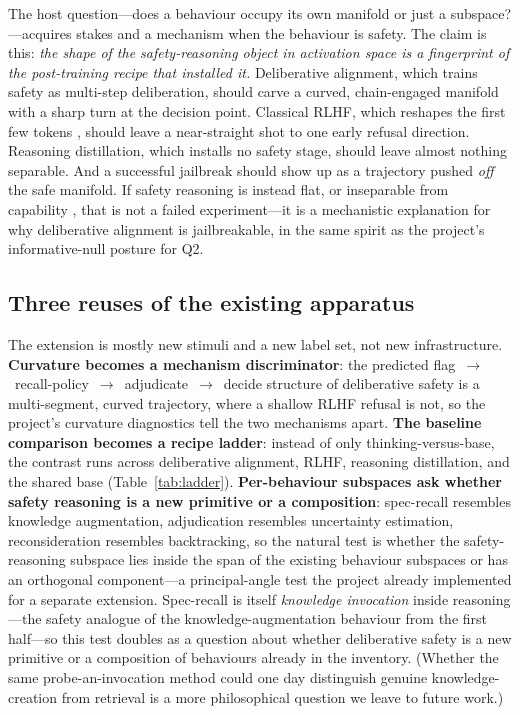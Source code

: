 \documentclass[10pt]{article}
\begin{document}
The host question---does a behaviour occupy its own manifold or just a
subspace?---acquires stakes and a mechanism when the behaviour is safety. The claim
is this: \emph{the shape of the safety-reasoning object in activation space is a
fingerprint of the post-training recipe that installed it.} Deliberative alignment,
which trains safety as multi-step deliberation, should carve a curved, chain-engaged
manifold with a sharp turn at the decision point. Classical RLHF, which reshapes the
first few tokens \citep{qi2025shallow}, should leave a near-straight shot to one
early refusal direction. Reasoning distillation, which installs no safety stage,
should leave almost nothing separable. And a successful jailbreak should show up as
a trajectory pushed \emph{off} the safe manifold. If safety reasoning is instead
flat, or inseparable from capability \citep{ponkshe2025safety}, that is not a failed
experiment---it is a mechanistic explanation for why deliberative alignment is
jailbreakable, in the same spirit as the project's informative-null posture for Q2.

\subsection{Three reuses of the existing apparatus}

The extension is mostly new stimuli and a new label set, not new infrastructure.
\textbf{Curvature becomes a mechanism discriminator}: the predicted
flag~$\to$~recall-policy~$\to$~adjudicate~$\to$~decide structure of deliberative
safety is a multi-segment, curved trajectory, where a shallow RLHF refusal is not,
so the project's curvature diagnostics tell the two mechanisms apart.
\textbf{The baseline comparison becomes a recipe ladder}: instead of only
thinking-versus-base, the contrast runs across deliberative alignment, RLHF, reasoning
distillation, and the shared base (Table~\ref{tab:ladder}). \textbf{Per-behaviour
subspaces ask whether safety reasoning is a new primitive or a composition}:
spec-recall resembles knowledge augmentation, adjudication resembles uncertainty
estimation, reconsideration resembles backtracking, so the natural test is whether
the safety-reasoning subspace lies inside the span of the existing behaviour
subspaces or has an orthogonal component---a principal-angle test the project already
implemented for a separate extension. Spec-recall is itself \emph{knowledge
invocation} inside reasoning---the safety analogue of the knowledge-augmentation
behaviour from the first half---so this test doubles as a question about whether
deliberative safety is a new primitive or a composition of behaviours already in the
inventory. (Whether the same probe-an-invocation method could one day distinguish
genuine knowledge-creation from retrieval is a more philosophical question we leave
to future work.)
\end{document}
